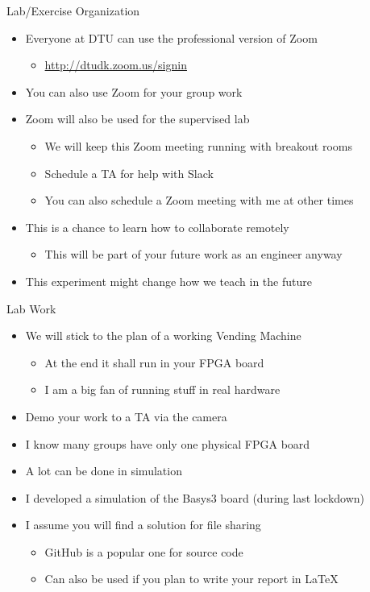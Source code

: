 \begin{frame}[fragile]{Lab/Exercise Organization}
\begin{itemize}
\item Everyone at DTU can use the professional version of Zoom
\begin{itemize}
\item \url{http://dtudk.zoom.us/signin}
\end{itemize}
\item You can also use Zoom for your group work
\item Zoom will also be used for the supervised lab
\begin{itemize}
\item We will keep this Zoom meeting running with breakout rooms
\item Schedule a TA for help with Slack
\item You can also schedule a Zoom meeting with me at other times
\end{itemize}
\item This is a chance to learn how to collaborate remotely
\begin{itemize}
\item This will be part of your future work as an engineer anyway
\end{itemize}
\item This experiment might change how we teach in the future
\end{itemize}
\end{frame}

\begin{frame}[fragile]{Lab Work}
\begin{itemize}
\item We will stick to the plan of a working Vending Machine
\begin{itemize}
\item At the end it shall run in your FPGA board
\item I am a big fan of running stuff in real hardware
\end{itemize}
\item Demo your work to a TA via the camera
\item I know many groups have only one physical FPGA board
\item A lot can be done in simulation
\item I developed a simulation of the Basys3 board (during last lockdown)
\item I assume you will find a solution for file sharing
\begin{itemize}
\item GitHub is a popular one for source code
\item Can also be used if you plan to write your report in LaTeX
\end{itemize}
\end{itemize}
\end{frame}

